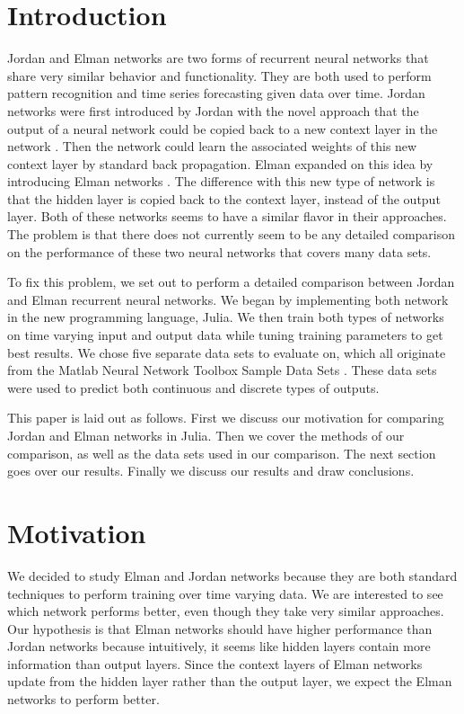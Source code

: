 \documentclass{acm_proc_article-sp}
\newcommand{\todo}[1]{\textcolor{orange}{\textbf{TODO}: #1}} %
\begin{document}
\section{Introduction} %
Jordan and Elman networks are two forms of recurrent neural networks that share very similar behavior and functionality. 
They are both used to perform pattern recognition and time series forecasting given data over time. 
Jordan networks were first introduced by Jordan with the novel approach that the output of a neural network could be copied back to a new context layer in the network \cite{jordan}. Then the network could learn the associated weights of this new context layer by standard back propagation. 
Elman expanded on this idea by introducing Elman networks \cite{elman}. 
The difference with this new type of network is that the hidden layer is copied back to the context layer, instead of the output layer. 
Both of these networks seems to have a similar flavor in their approaches.
The problem is that there does not currently seem to be any detailed comparison on the performance of these two neural networks that covers many data sets. 

To fix this problem, we set out to perform a detailed comparison between Jordan and Elman recurrent neural networks. 
We began by implementing both network in the new programming language, Julia. 
We then train both types of networks on time varying input and output data while tuning training parameters to get best results. 
We chose five separate data sets to evaluate on, which all originate from the Matlab Neural Network Toolbox Sample Data Sets \cite{data}. 
These data sets were used to predict both continuous and discrete types of outputs.

This paper is laid out as follows. First we discuss our motivation for comparing Jordan and Elman networks in Julia. %
Then we cover the methods of our comparison, as well as the data sets used in our comparison. The next section goes over our results. Finally we discuss our results and draw conclusions.

\section{Motivation}
We decided to study Elman and Jordan networks because they are both standard techniques to perform training over time varying data. 
We are interested to see which network performs better, even though they take very similar approaches. 
Our hypothesis is that Elman networks should have higher performance than Jordan networks because intuitively, it seems like hidden layers contain more information than output layers. Since the context layers of Elman networks update from the hidden layer rather than the output layer, we expect the Elman networks to perform better. 
\end{document}

